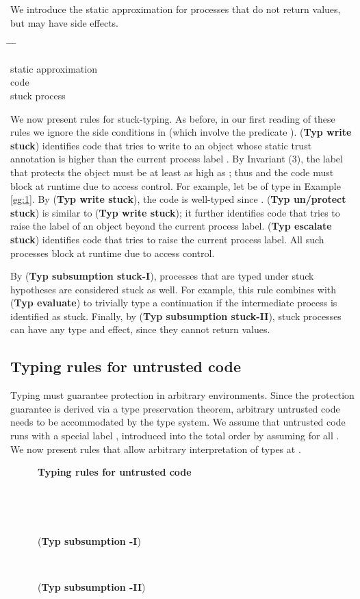 \documentclass{sigplanconf}
\newenvironment{defn}{\begin{tabbing}
  \hspace{1.5em} \= \hspace{.20\linewidth - 1.5em} \= \hspace{1.5em} \= \kill
  }{
  \end{tabbing}}
\def\upbracketfill{}
\def\downbracketfill{}
\newcommand{\cenvvv}[3]{\vspace{0.8mm}
\begin{flushleft}
\parbox{8.4cm}{{\bf #1} }
\\
\parbox{8.4cm}{\downbracketfill}
\\
\vspace{-0.2cm}
\end{flushleft}
#3
\begin{flushleft}
\parbox{8.4cm}{\upbracketfill}
\end{flushleft}}
\newcommand{\entry}[2]{\>\>\>#2}
\newcommand{\clause}[2]{\>\>#2}
\newcommand{\mycategory}[2]{\clause{#1::=}{#2}}
\newcommand{\trule}[1]{(\textbf{Typ #1})}
\begin{document}
We introduce the static approximation  for processes that do not return values, but may have side effects. 
\begin{defn}
\mycategory{T}{static approximation}\\
\entry{\cdots}{code}\\
\entry{\mathbf{Stuck}}{stuck process}
\end{defn}
We now present rules for stuck-typing. As before, in our first reading of these rules we ignore the side conditions in  (which involve the predicate ). 
\trule{write stuck} identifies code that tries to write to an object whose static trust annotation  is higher than the current process label . By Invariant (3), the label  that protects the object must be at least as high as ; thus  and the code must block at runtime due to access control. For example, let  be of type  in Example \ref{eg:1}. By \trule{write stuck}, the code  is well-typed since . \trule{un/protect stuck} is similar to \trule{write stuck}; it further identifies code that tries to raise the label of an object beyond the current process label. \trule{escalate stuck} identifies code that tries to raise the current process label. All such processes block at runtime due to access control. 

By \trule{subsumption stuck-I}, processes that are typed under stuck hypotheses are considered stuck as well. For example, this rule combines with \trule{evaluate} to trivially type a continuation  if the intermediate process  is identified as stuck. Finally, by \trule{subsumption stuck-II}, stuck processes can have any type and effect, since they cannot return values.

\subsection{Typing rules for untrusted code}\label{arbit}
Typing must guarantee protection in arbitrary environments. Since the protection guarantee is derived via a type preservation theorem, arbitrary untrusted code needs to be accommodated by the type system. 
We assume that untrusted code runs with a special label , introduced into the total order by assuming  for all . 
We now present rules that allow arbitrary interpretation of types at . 
\begin{figure}
\cenvvv{Typing rules for untrusted code}{}{({\bf Typ subsumption -I})\vspace{-1mm}

~

({\bf Typ subsumption -II})\vspace{-1mm}

}
\end{figure}
\end{document}
